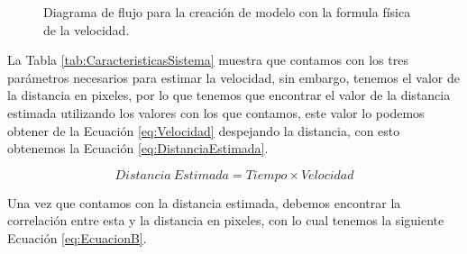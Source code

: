 \begin{figure}[H]
    \centering

    \caption{Diagrama de flujo para la creación de modelo con la formula física de la velocidad.}
    \label{fig:CrearModeloCustom}
\end{figure}

La Tabla \ref{tab:CaracteristicasSistema} muestra que contamos con los tres parámetros necesarios para estimar la velocidad, sin embargo, tenemos el valor de la distancia en pixeles, por lo que tenemos que encontrar el valor de la distancia estimada utilizando los valores con los que contamos, este valor lo podemos obtener de la Ecuación \ref{eq:Velocidad} despejando la distancia, con esto obtenemos la  Ecuación \ref{eq:DistanciaEstimada}.

\begin{equation}
    \label{eq:DistanciaEstimada}
    Distancia\:Estimada = Tiempo \times Velocidad
\end{equation}

Una vez que contamos con la distancia estimada, debemos encontrar la correlación entre esta y la distancia en pixeles, con lo cual tenemos la siguiente Ecuación \ref{eq:EcuacionB}.


